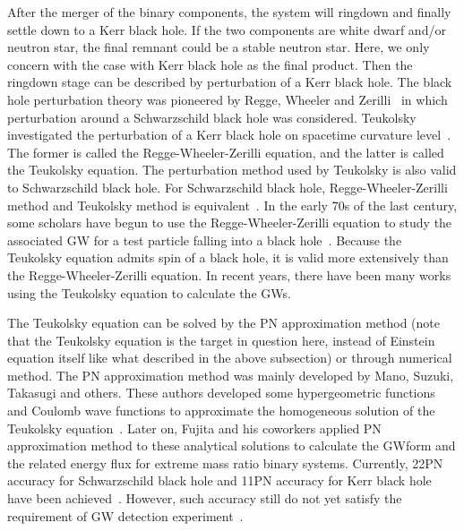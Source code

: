 \documentclass[a4paper,11pt]{article}
\begin{document}
After the merger of the binary components, the system will ringdown and finally settle down to a Kerr black hole. If the two components are white dwarf and/or neutron star, the final remnant could  be a stable neutron star. Here, we only concern with the case with Kerr black hole as the final product. Then the ringdown stage can be described by perturbation of a Kerr black hole. The black hole perturbation theory was pioneered by Regge, Wheeler and Zerilli~\cite{Regge:1957td,Zerilli:1971wd} in which perturbation around a Schwarzschild black hole  was considered. Teukolsky investigated the perturbation of a Kerr black hole on spacetime curvature level~\cite{Teukolsky:1973ha,Teukolsky:1974yv}. The former is called the Regge-Wheeler-Zerilli equation, and the latter is called the Teukolsky equation. The perturbation method used by Teukolsky is also valid to Schwarzschild black hole. For Schwarzschild black hole, Regge-Wheeler-Zerilli method and Teukolsky method is equivalent~\cite{chandrasekhar1998mathematical}. In the early 70s of the last century, some scholars have begun to use the Regge-Wheeler-Zerilli equation to study the associated GW for a test particle falling into a black hole~\cite{Davis:1972ud,Ruffini:1973ky,Fujita:2004rb}. Because the Teukolsky equation admits spin of a black hole, it is valid more extensively than the Regge-Wheeler-Zerilli equation. In recent years, there have been many works using the Teukolsky equation to calculate the GWs.

The Teukolsky equation can be solved by the PN approximation method (note that the Teukolsky equation is the target in question here, instead of Einstein equation itself like what described in the above subsection) or through numerical method. The PN approximation method was mainly developed by Mano, Suzuki, Takasugi and others. These authors developed some hypergeometric functions and Coulomb wave functions to approximate the homogeneous solution of the Teukolsky equation~\cite{Tagoshi:1996gh,Sasaki:2003xr}. Later on, Fujita and his coworkers applied PN approximation method to these analytical solutions to calculate the GWform and the related energy flux for extreme mass ratio binary systems. Currently, 22PN accuracy for Schwarzschild black hole and 11PN accuracy for Kerr black hole have been achieved~\cite{Fujita:2012cm,Fujita:2014eta}. However, such accuracy  still do not yet satisfy the requirement of GW detection experiment~\cite{Sago:2016xsp}.
\end{document}
